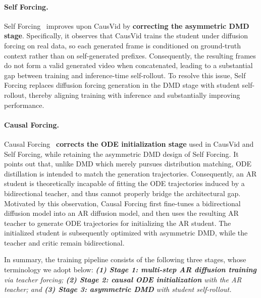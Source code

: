 \paragraph{Self Forcing.}
Self Forcing~\cite{huang2025self} improves upon CausVid by \textbf{correcting the asymmetric DMD stage}. Specifically, it observes that CausVid trains the student under diffusion forcing on real data, so each generated frame is conditioned on ground-truth context rather than on self-generated prefixes. Consequently, the resulting frames do not form a valid generated video when concatenated, leading to a substantial gap between training and inference-time self-rollout. To resolve this issue, Self Forcing replaces diffusion forcing generation in the DMD stage with student self-rollout, thereby aligning training with inference and substantially improving performance.

\paragraph{Causal Forcing.}
Causal Forcing~\cite{zhu2026causal} \textbf{corrects the ODE initialization stage} used in CausVid and Self Forcing, while retaining the asymmetric DMD design of Self Forcing. It points out that, unlike DMD which merely pursues distribution matching, ODE distillation is intended to match the generation trajectories. Consequently, an AR student is theoretically incapable of fitting the ODE trajectories induced by a bidirectional teacher, and thus cannot properly bridge the architectural gap. Motivated by this observation, Causal Forcing first fine-tunes a bidirectional diffusion model into an AR diffusion model, and then uses the resulting AR teacher to generate ODE trajectories for initializing the AR student. The initialized student is subsequently optimized with asymmetric DMD, while the teacher and critic remain bidirectional. 

In summary, the training pipeline consists of the following three stages, whose terminology we adopt below: \emph{\textbf{(1) Stage 1: multi-step AR diffusion training} via teacher forcing; \textbf{(2) Stage 2: causal ODE initialization} with the AR teacher; and \textbf{(3) Stage 3: asymmetric DMD} with student self-rollout.} 
